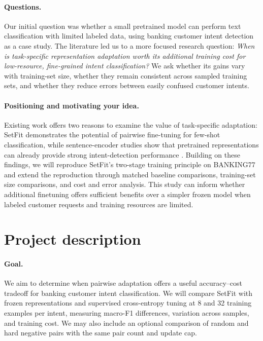 \documentclass{article}
\begin{document}
\paragraph{Questions.}
Our initial question was whether a small pretrained model can perform text classification with limited labeled data, using banking customer intent detection as a case study. The literature led us to a more focused research question: \emph{When is task-specific representation adaptation worth its additional training cost for low-resource, fine-grained intent classification?} We ask whether its gains vary with training-set size, whether they remain consistent across sampled training sets, and whether they reduce errors between easily confused customer intents.



\paragraph{Positioning and motivating your idea.}
Existing work offers two reasons to examine the value of task-specific adaptation: SetFit demonstrates the potential of pairwise fine-tuning for few-shot classification, while sentence-encoder studies show that pretrained representations can already provide strong intent-detection performance \cite{tunstall2022setfit,casanueva2020intent,ma2022encoding}. Building on these findings, we will reproduce SetFit's two-stage training principle on BANKING77 and extend the reproduction through matched baseline comparisons, training-set size comparisons, and cost and error analysis. This study can inform whether additional finetuning offers sufficient benefits over a simpler frozen model when labeled customer requests and training resources are limited.


\newpage
\section{Project description}
\label{sec:description}

\paragraph{Goal.}
We aim to determine when pairwise adaptation offers a useful accuracy--cost tradeoff for banking customer intent classification. We will compare SetFit with frozen representations and supervised cross-entropy tuning at 8 and 32 training examples per intent, measuring macro-F1 differences, variation across samples, and training cost. We may also include an optional comparison of random and hard negative pairs with the same pair count and update cap.
\end{document}
